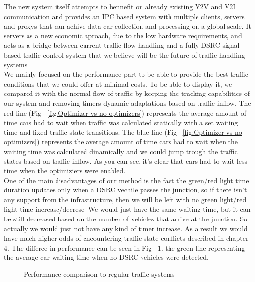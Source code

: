 \documentclass[17pt]{report}
\begin{document}
\indent
The new system itself attempts to bennefit on already existing V2V and V2I
communication and provides an IPC based system with multiple clients, servers
and proxys that can achive data car collection and processing on a global scale.
It servers as a new economic aproach, due to the low hardware requirements,
and acts as a bridge between current traffic flow handling and a fully 
DSRC signal based traffic control system that we believe will be the 
future of traffic handling systems. \\
\indent 
We mainly focused on the performance part to be able to provide
the best traffic conditions that we could offer at minimal costs.
To be able to display it, we compared it with the normal 
flow of traffic by keeping the tracking capabilities of our system 
and removing timers dynamic adaptations based on traffic inflow. 
The red line (Fig ~\ref{fig:Optimizer vs no optimizers}) represents the 
average amount of time cars had to wait when traffic was 
calculated statically with a set waiting time and fixed traffic state 
transitions. The blue line (Fig ~\ref{fig:Optimizer vs no optimizers}) 
represents the average amount of time cars had to wait when the 
waiting time was calculated dinamically and we could jump trough 
the traffic states based on traffic inflow. As you can see,
it's clear that cars had to wait less time when the optimiziers
were enabled. \\
\indent 
One of the main disadvantages of our method is the fact the
green/red light time duration updates only when a DSRC vechile
passes the junction, so if there isn't any support from the infrastructure,
then we will be left with no green light/red light time increase/decrese.
We would just have the same waiting time, but it can be still decreased 
based on the number of vehicles that arrive at the junction. So actually
we would just not have any kind of timer increase. As a result we would 
have much higher odds of encountering traffic state conflicts described in 
chapter 4. The differce in performance can be seen in Fig 
~\ref{fig:All Optimizer vs no timer duration update}, the green line 
representing the average car waiting time when no DSRC vehicles were 
detected.
\begin{figure}[h!]
    \centering
    \label{fig:All Optimizer vs no timer duration update}
    \caption{Performance comparison to regular traffic systems}
\end{figure}
\end{document}
